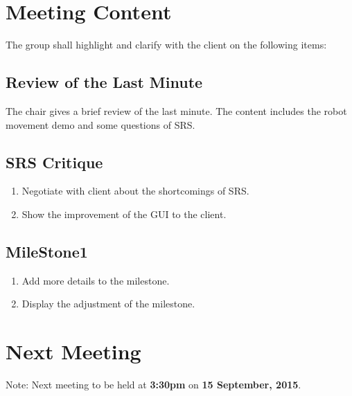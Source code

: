 \documentclass[a4paper] {article}
\begin{document}
	\section{Meeting Content}
	The group shall highlight and clarify with the client on the following items:
	
	\subsection{Review of the Last Minute}
   	The chair gives a brief review of the last minute. The content includes the robot movement demo and  	    some questions of SRS.
   	
	
	\subsection{SRS Critique}
	\begin{enumerate}
	\item Negotiate with client about the shortcomings of SRS.
	\item Show the improvement of the GUI to the client. 
   	\end{enumerate}
   
    \subsection{MileStone1}
	\begin{enumerate}
	\item Add more details to the milestone.
	\item Display the adjustment of the milestone.
	
    \end{enumerate}
	\section{Next Meeting}
	Note: Next meeting to be held at \textbf{3:30pm} on \textbf {15 September, 2015}. 
	
\end{document}
